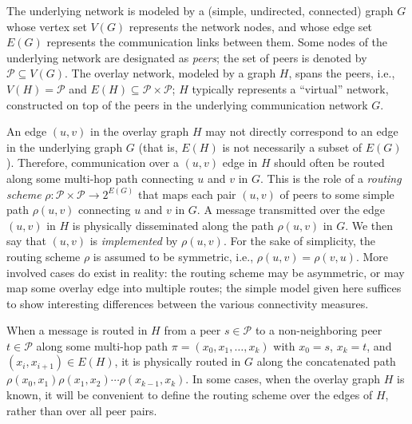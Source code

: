 \LongVersion \documentclass[11pt]{article}
\theoremstyle{definition}
\theoremstyle{plain}
\newcommand{\Vertices}[0]{\mathit{V}}
\newcommand{\Edges}[0]{\mathit{E}}
\newcommand{\Peers}[0]{\mathcal{P}}
\begin{document}
The underlying network is modeled by a (simple, undirected, connected)
graph $G$ whose vertex set $\Vertices(G)$ represents the network nodes,
and whose edge set $\Edges(G)$ represents the communication links between them.
Some nodes of the underlying network are designated as \emph{peers};
the set of peers is denoted by $\Peers \subseteq \Vertices(G)$.
The overlay network, modeled by a graph $H$, spans the peers, i.e.,
$\Vertices(H) = \Peers$ and $\Edges(H) \subseteq \Peers \times \Peers$;
$H$ typically represents a ``virtual'' network, constructed on top of
the peers in the underlying communication network $G$.

An edge $(u, v)$ in the overlay graph $H$ may not directly correspond to an
edge in the underlying graph $G$ (that is, $\Edges(H)$ is not necessarily a
subset of $\Edges(G)$).
Therefore, communication over a $(u, v)$ edge in $H$ should
often be routed along some multi-hop path connecting $u$ and $v$ in $G$.
This is the role of a \emph{routing scheme} $\rho : \Peers \times \Peers
\rightarrow 2^{\Edges(G)}$ that maps each pair $(u, v)$ of peers to some
simple path $\rho(u, v)$ connecting $u$ and $v$ in $G$.
A message transmitted over the edge $(u, v)$ in $H$ is physically disseminated
along the path $\rho(u, v)$ in $G$.
We then say that $(u, v)$ is \emph{implemented} by $\rho(u, v)$.
For the sake of simplicity, the routing scheme $\rho$ is assumed to be
symmetric, i.e., $\rho(u, v) = \rho(v, u)$.
More involved cases do exist in reality:
the routing scheme may be asymmetric, or may map some overlay edge into
multiple routes;
the simple model given here suffices to show interesting differences between
the various connectivity measures.

When a message is routed in $H$ from a peer $s \in \Peers$ to a
non-neighboring peer $t \in \Peers$ along some multi-hop path $\pi = (x_0, x_1,
\dots, x_k)$ with $x_0 = s$, $x_k = t$, and $(x_i, x_{i + 1}) \in E(H)$, it is
physically routed in $G$ along the concatenated path $\rho(x_0, x_1) \rho(x_1,
x_2) \cdots \rho(x_{k - 1}, x_k)$.
In some cases, when the overlay graph $H$ is known, it will be convenient to
define the routing scheme over the edges of $H$, rather than over all peer
pairs.
\end{document}
